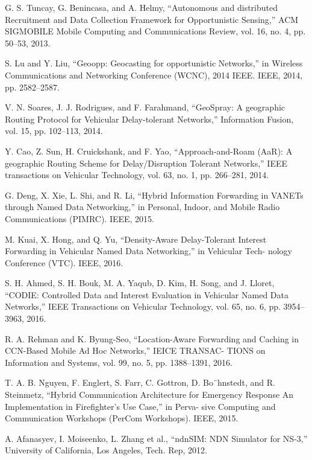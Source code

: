 \documentclass[10pt, conference, compsocconf]{IEEEtran}
\begin{document}
\begin{thebibliography}{1}
	
	G. S. Tuncay, G. Benincasa, and A. Helmy, “Autonomous and distributed Recruitment and Data Collection Framework for Opportunistic Sensing,” ACM SIGMOBILE Mobile Computing and Communications Review, vol. 16, no. 4, pp. 50–53, 2013.
	
	
	S. Lu and Y. Liu, “Geoopp: Geocasting for opportunistic Networks,” in Wireless Communications and Networking Conference (WCNC), 2014 IEEE. IEEE, 2014, pp. 2582–2587.
	
	
	V. N. Soares, J. J. Rodrigues, and F. Farahmand, “GeoSpray: A geographic Routing Protocol for Vehicular Delay-tolerant Networks,” Information Fusion, vol. 15, pp. 102–113, 2014.
	
	
	Y. Cao, Z. Sun, H. Cruickshank, and F. Yao, “Approach-and-Roam (AaR): A geographic Routing Scheme for Delay/Disruption Tolerant Networks,” IEEE transactions on Vehicular Technology, vol. 63, no. 1, pp. 266–281, 2014.
	
	
	G. Deng, X. Xie, L. Shi, and R. Li, “Hybrid Information Forwarding in VANETs through Named Data Networking,” in Personal, Indoor, and Mobile Radio Communications (PIMRC). IEEE, 2015.
	
	
	M. Kuai, X. Hong, and Q. Yu, “Density-Aware Delay-Tolerant Interest Forwarding in Vehicular Named Data Networking,” in Vehicular Tech- nology Conference (VTC). IEEE, 2016.
	
	
	S. H. Ahmed, S. H. Bouk, M. A. Yaqub, D. Kim, H. Song, and J. Lloret, “CODIE: Controlled Data and Interest Evaluation in Vehicular Named Data Networks,” IEEE Transactions on Vehicular Technology, vol. 65, no. 6, pp. 3954–3963, 2016.
	
	
	R. A. Rehman and K. Byung-Seo, “Location-Aware Forwarding and Caching in CCN-Based Mobile Ad Hoc Networks,” IEICE TRANSAC- TIONS on Information and Systems, vol. 99, no. 5, pp. 1388–1391, 2016.
	
	
	T.  A.  B.  Nguyen,  F.  Englert,  S.  Farr,  C.  Gottron,  D.  Bo¨hnstedt,  and R. Steinmetz, “Hybrid Communication Architecture for Emergency Response An Implementation in Fireﬁghter’s  Use  Case,”  in  Perva- sive Computing and Communication Workshops (PerCom Workshops). IEEE, 2015.
	
	
	A. Afanasyev, I. Moiseenko, L. Zhang et al., “ndnSIM: NDN Simulator for NS-3,” University of California, Los Angeles, Tech. Rep, 2012.
	

\end{thebibliography}


\end{document}
